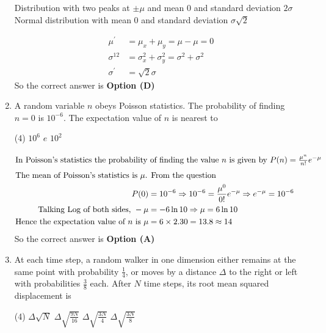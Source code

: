 \begin{enumerate}
\begin{tasks}
		\task[\textbf{C.}] Distribution with two peaks at $\pm \mu$ and mean 0 and standard deviation $2 \sigma$
		\task[\textbf{D.}] Normal distribution with mean 0 and standard deviation $\sigma \sqrt{2}$
	\end{tasks}
	\begin{answer}
		\begin{align*}
		\mu^{\prime}&=\mu_{x}+\mu_{y}=\mu-\mu=0\\
		\sigma^{12}&=\sigma_{x}^{2}+\sigma_{y}^{2}=\sigma^{2}+\sigma^{2}\\
		\sigma^{\prime}&=\sqrt{2} \sigma
		\end{align*}
		So the correct answer is \textbf{Option (D)}
	\end{answer}
	\item  A random variable $n$ obeys Poisson statistics. The probability of finding $n=0$ is $10^{-6}$. The expectation value of $n$ is nearest to
	{}
	\begin{tasks}(4)
		\task[\textbf{B.}] $10^{6}$
		\task[\textbf{C.}] $e$
		\task[\textbf{D.}] $10^{2}$
	\end{tasks}
	\begin{answer}
		\begin{align*}
		\intertext{In Poisson's statistics the probability of finding the value $n$ is given by $P(n)=\frac{\mu^{n}}{n !} e^{-\mu}$}
		\intertext{The mean of Poisson's statistics is $\mu$. From the question}
		P(0)&=10^{-6} \Rightarrow 10^{-6}=\frac{\mu^{0}}{0 !} e^{-\mu} \Rightarrow e^{-\mu}=10^{-6}\\
		\text{	Talking Log of both sides, }-\mu&=-6 \ln 10 \Rightarrow \mu=6 \ln 10\\
		\text{Hence the expectation value of $n$ is }\mu&=6 \times 2.30=13.8 \approx 14
		\end{align*}
		So the correct answer is \textbf{Option (A)}
	\end{answer}
\item At each time step, a random walker in one dimension either remains at the same point with probability $\frac{1}{4}$, or moves by a distance $\Delta$ to the right or left with probabilities $\frac{3}{8}$ each. After $N$ time steps, its root mean squared displacement is
{}
\begin{tasks}(4)
	\task[\textbf{A.}] $\Delta \sqrt{N}$
	\task[\textbf{B.}] $\Delta \sqrt{\frac{9 N}{16}}$
	\task[\textbf{C.}] $\Delta \sqrt{\frac{3 N}{4}}$
	\task[\textbf{D.}] $\Delta \sqrt{\frac{3 N}{8}}$
\end{tasks}

\end{enumerate}
